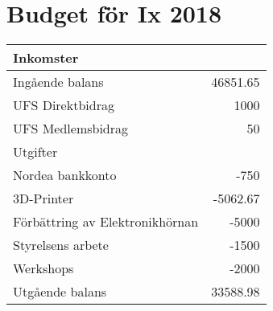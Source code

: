 \documentclass[a4paper,11pt,oneside]{article}
\begin{document}
\section*{Budget för Ix 2018}

\begin{tabular}{lr}
  \toprule
  Inkomster & \\
  \midrule
  Ingående balans & 46851.65 \\
  UFS Direktbidrag & 1000 \\
  UFS Medlemsbidrag & 50 \\
  \midrule
  Utgifter & \\
  \midrule
  Nordea bankkonto & -750 \\
  3D-Printer & -5062.67 \\
  Förbättring av Elektronikhörnan & -5000 \\
  Styrelsens arbete & -1500 \\
  Werkshops & -2000 \\
  \midrule
  Utgående balans & 33588.98 \\
  \bottomrule
\end{tabular}
\end{document}
